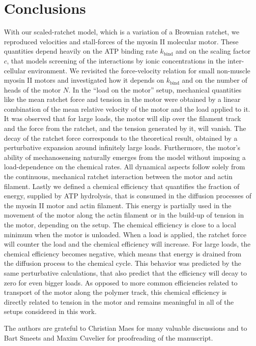 \documentclass[aps,pre,twocolumn,showpacs,showkeys,superscriptaddress,floatfix]{revtex4-1}
\begin{document}
\section{Conclusions}
With our scaled-ratchet model, which is a variation of a Brownian ratchet, we reproduced velocities and stall-forces of the myosin II molecular motor. 
These quantities depend heavily on the ATP binding rate $k_\text{bind}$ and on the scaling factor $c$, that models screening of the interactions by ionic concentrations in the inter-cellular environment.
We revisited the force-velocity relation for small non-muscle myosin II motors 
and investigated how it depends on $k_\text{bind}$ and on the number of heads of the motor $N$.
In the ``load on the motor'' setup, mechanical quantities like the mean ratchet force and tension in the motor were obtained by a linear combination of the mean relative velocity of the motor and the load applied to it. 
It was observed that for large loads, the motor will slip over the filament track and the force from the ratchet, and the tension generated by it, will vanish.
The decay of the ratchet force corresponds to the theoretical result, obtained by a perturbative expansion around infinitely large loads.
Furthermore, the motor's ability of mechanosensing naturally emerges from the model without imposing a load-dependence on the chemical rates.
All dynamical aspects follow solely from the continuous, mechanical ratchet interaction between the motor and actin filament.
Lastly we defined a chemical efficiency that quantifies the fraction of energy, supplied by ATP hydrolysis, 
that is consumed in the diffusion processes of the myosin II motor and actin filament.
This energy is partially used in the movement of the motor along the actin filament or in the build-up of tension in the motor, depending on the setup. 
The chemical efficiency is close to a local minimum when the motor is unloaded. 
When a load is applied, the ratchet force will counter the load and the chemical efficiency will increase. 
For large loads, the chemical efficiency becomes negative, which means that energy is drained from the diffusion process to the chemical cycle.
This behavior was predicted by the same perturbative calculations, that also predict that the efficiency will decay to zero for even bigger loads.
As opposed to more common efficiencies related to transport of the motor along the polymer track, this chemical efficiency is directly related to tension in the motor and remains meaningful in all of the setups considered in this work. 
\begin{acknowledgments}
The authors are grateful to Christian Maes for many valuable discussions and to Bart Smeets and Maxim Cuvelier for proofreading of the manuscript.
\end{acknowledgments}
\end{document}
